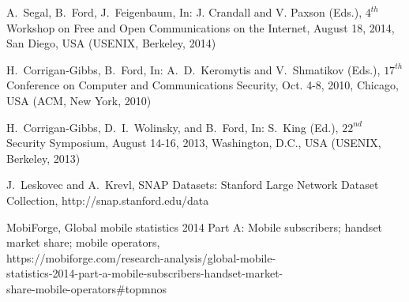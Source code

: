 \documentclass[USenglish,oneside,twocolumn]{article}
\begin{document}

\begin{thebibliography}{99}
 A.~Segal, B.~Ford, J.~Feigenbaum, 
In: J. Crandall and V. Paxson (Eds.), $4^{th}$ Workshop on Free and 
Open Communications on the Internet, August 18, 2014, San Diego, 
USA (USENIX, Berkeley, 2014)

 H.~Corrigan-Gibbs, B.~Ford, In: A.~D.~Keromytis and 
V.~Shmatikov (Eds.), $17^{th}$ Conference on Computer and Communications 
Security, Oct. 4-8, 2010, Chicago, USA (ACM, New York, 2010)

 H.~Corrigan-Gibbs, D.~I.~Wolinsky, and B.~Ford, In: 
S.~King (Ed.), $22^{nd}$ Security Symposium, August 14-16, 2013, 
Washington, D.C., USA (USENIX, Berkeley, 2013) 

 J.~Leskovec and A.~Krevl, SNAP Datasets: 
Stanford Large Network Dataset Collection, 
http://snap.stanford.edu/data

 MobiForge, Global mobile statistics 2014 Part A: 
Mobile subscribers; handset market share; mobile operators,\\ 
https://mobiforge.com/research-analysis/global-mobile-\\
statistics-2014-part-a-mobile-subscribers-handset-market-\\
share-mobile-operators\#topmnos


\end{thebibliography}
\end{document}
